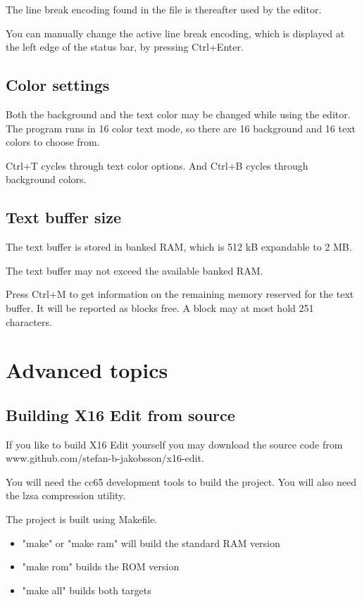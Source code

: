 \documentclass{article}
\begin{document}
        The line break encoding found in the file is thereafter used by the editor.

        You can manually change the active line break encoding, which is displayed at the left edge of the status bar,
        by pressing Ctrl+Enter.

    \subsection{Color settings}
        Both the background and the text color may be changed while using the editor. 
        The program runs in 16 color text mode, so there are 16 background and 16 text colors to choose from.

        Ctrl+T cycles through text color options.
        And Ctrl+B cycles through background colors.

    \subsection{Text buffer size}
        The text buffer is stored in banked RAM, which is 512 kB expandable to 2 MB.

        The text buffer may not exceed the available banked RAM.

        Press Ctrl+M to get information on the remaining memory reserved for the
        text buffer. It will be reported as blocks free. A block may at most hold 251 characters.

\section{Advanced topics}

    \subsection{Building X16 Edit from source}
        If you like to build X16 Edit yourself you may download the source code from
        www.github.com/stefan-b-jakobsson/x16-edit.

        You will need the cc65 development tools to build the project. You will also need the lzsa compression utility.

        The project is built using Makefile.

        \begin{itemize}
            \item "make" or "make ram" will build the standard RAM version
            \item "make rom" builds the ROM version
            \item "make all" builds both targets
        \end{itemize}
\end{document}
